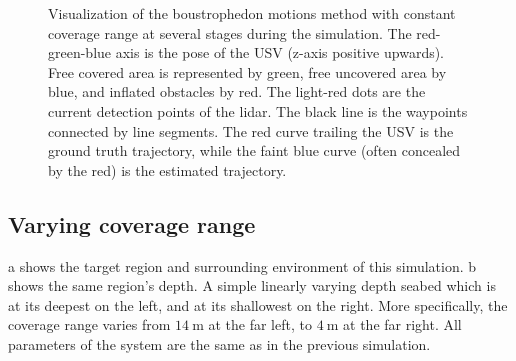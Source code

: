 \begin{figure}[h!]
{\begin{subfigure}[b]{0.5\textwidth}
		\caption{}
	\end{subfigure}
	}
    \caption[Visualization of the boustrophedon motions method with constant coverage range at several stages during the simulation.]{Visualization of the boustrophedon motions method with constant coverage range at several stages during the simulation. The red-green-blue axis is the pose of the USV (z-axis positive upwards). Free covered area is represented by green, free uncovered area by blue, and inflated obstacles by red. The light-red dots are the current detection points of the lidar. The black line is the waypoints connected by line segments. The red curve trailing the USV is the ground truth trajectory, while the faint blue curve (often concealed by the red) is the estimated trajectory.}
	\label{fig:bm1_res}
\end{figure}

\FloatBarrier


\subsection{Varying coverage range}

a shows the target region and surrounding environment of this simulation. b shows the same region's depth. A simple linearly varying depth seabed which is at its deepest on the left, and at its shallowest on the right. More specifically, the coverage range varies from $\SI{14}{\meter}$ at the far left, to $\SI{4}{\meter}$ at the far right. All parameters of the system are the same as in the previous simulation.

